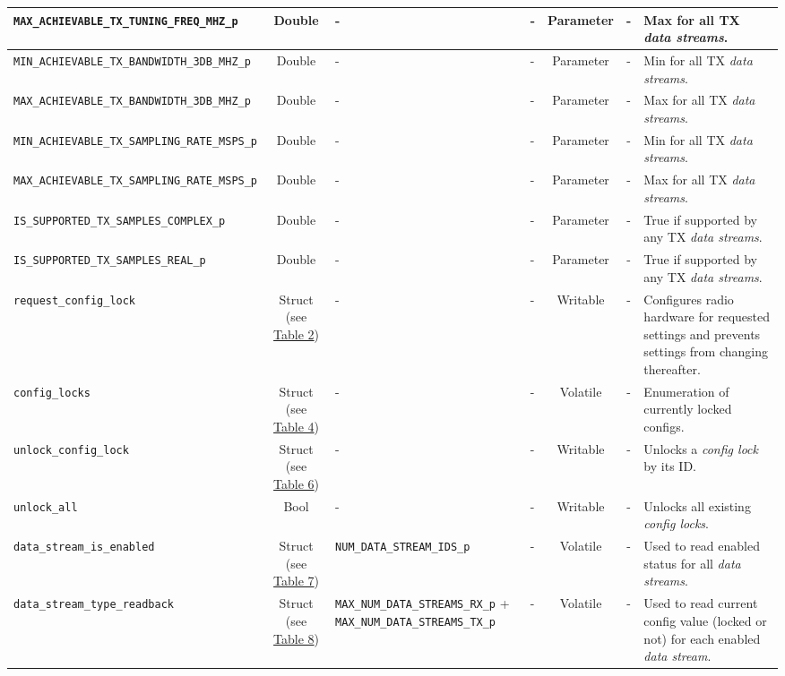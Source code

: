 \documentclass{article}
\begin{document}
\begin{landscape}
\begin{scriptsize}
\begin{longtable}{|p{5.3cm}|c|p{3.5cm}|p{3.5cm}|c|c|p{4.4cm}|}
			\hline
			\verb+MAX_ACHIEVABLE_TX_TUNING_FREQ_MHZ_p+        & Double & -        & - & Parameter           & -       & Max for all TX \textit{data streams}. \\
			\hline
			\verb+MIN_ACHIEVABLE_TX_BANDWIDTH_3DB_MHZ_p+      & Double & -        & - & Parameter           & -       & Min for all TX \textit{data streams}. \\
			\hline
			\verb+MAX_ACHIEVABLE_TX_BANDWIDTH_3DB_MHZ_p+      & Double & -        & - & Parameter           & -       & Max for all TX \textit{data streams}. \\
			\hline
			\verb+MIN_ACHIEVABLE_TX_SAMPLING_RATE_MSPS_p+      & Double & -        & - & Parameter           & -       & Min for all TX \textit{data streams}. \\
			\hline
			\verb+MAX_ACHIEVABLE_TX_SAMPLING_RATE_MSPS_p+      & Double & -        & - & Parameter           & -       & Max for all TX \textit{data streams}. \\
			\hline
			\verb+IS_SUPPORTED_TX_SAMPLES_COMPLEX_p+           & Double & -        & - & Parameter           & -       & True if supported by any TX \textit{data streams}. \\
			\hline
			\verb+IS_SUPPORTED_TX_SAMPLES_REAL_p+              & Double & -        & - & Parameter           & -       & True if supported by any TX \textit{data streams}. \\
			\hline
			\verb+request_config_lock+          & Struct (see \hyperlink{tab2}{Table 2}) & - & -       & Writable    & -       & Configures radio hardware for requested settings and prevents settings from changing thereafter. \\
			\hline
			\verb+config_locks+                 & Struct (see \hyperlink{tab4}{Table 4}) & - & -       & Volatile & -       & Enumeration of currently locked configs. \\
			\hline
			\verb+unlock_config_lock+           & Struct (see \hyperlink{tab6}{Table 6}) & - & -       & Writable    & -       & Unlocks a \textit{config lock} by its ID. \\
			\hline
			\verb+unlock_all+                   & Bool & - & -       & Writable    & -       & Unlocks all existing \textit{config locks}. \\
			\hline
			\verb+data_stream_is_enabled+       & Struct (see \hyperlink{tab7}{Table 7}) & \verb+NUM_DATA_STREAM_IDS_p+ & - & Volatile    & -       & Used to read enabled status for all \textit{data streams}. \\
			\hline
			\verb+data_stream_type_readback+       & Struct (see \hyperlink{tab8}{Table 8}) & \verb+MAX_NUM_DATA_STREAMS_RX_p+ + \verb+MAX_NUM_DATA_STREAMS_TX_p+ & - &Volatile    & -       & Used to read current config value (locked or not) for each enabled \textit{data stream}. \\

\end{longtable}
\end{scriptsize}
\end{landscape}
\end{document}
